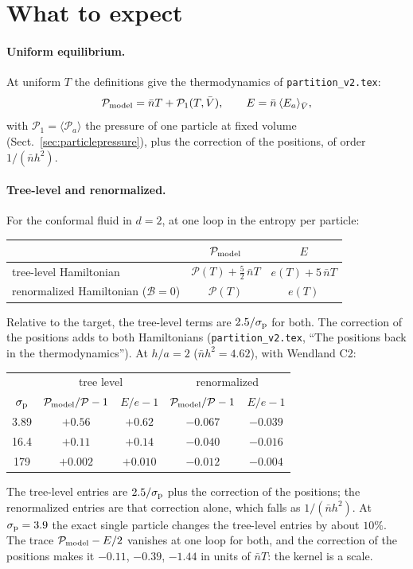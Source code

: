 \documentclass[11pt,aps,preprint,nofootinbib,superscriptaddress,tightenlines]{revtex4-2}
\newcommand{\avg}[1]{\langle #1\rangle}
\newcommand{\klab}{\mathcal B}
\def\pr{{\mathcal P}}
\def\er{e}
\def\st{\begin{equation}}
\def\stp{\end{equation}}
\def\Sect#1{Sect.~\ref{#1}}
\let\oldparagraph\paragraph
\renewcommand{\paragraph}{\par\bigskip\oldparagraph}
\begin{document}
\section{What to expect}
\label{sec:expect}

\paragraph{Uniform equilibrium.}  At uniform $T$ the definitions give the thermodynamics of \texttt{partition\_v2.tex}:
\st
\pr_{\rm model}=\bar nT+\pr_1(T,\bar V),\qquad E=\bar n\,\avg{E_a}_{\bar V} ,
\stp
with $\pr_1=\avg{\pr_a}$ the pressure of one particle at fixed volume (\Sect{sec:particlepressure}), plus the correction of the positions, of order $1/(\bar nh^2)$.

\paragraph{Tree-level and renormalized.}  For the conformal fluid in $d=2$, at one loop in the entropy per particle:
\begin{center}
\begin{tabular}{lcc}
\toprule
 & $\pr_{\rm model}$ & $E$ \\
\midrule
tree-level Hamiltonian & $\pr(T)+\tfrac52\,\bar nT$ & $\er(T)+5\,\bar nT$ \\
renormalized Hamiltonian ($\klab=0$) & $\pr(T)$ & $\er(T)$ \\
\bottomrule
\end{tabular}
\end{center}
Relative to the target, the tree-level terms are $2.5/\sigma_{\rm p}$ for both.  The correction of the positions adds to both Hamiltonians (\texttt{partition\_v2.tex},
``The positions back in the thermodynamics'').  At $h/a=2$ ($\bar nh^2=4.62$), with Wendland C2:
\begin{center}
\begin{tabular}{ccccc}
\toprule
 & \multicolumn{2}{c}{tree level} & \multicolumn{2}{c}{renormalized} \\
$\sigma_{\rm p}$ & $\pr_{\rm model}/\pr-1$ & $E/\er-1$ & $\pr_{\rm model}/\pr-1$ & $E/\er-1$ \\
\midrule
3.89 & $+0.56$ & $+0.62$ & $-0.067$ & $-0.039$ \\
16.4 & $+0.11$ & $+0.14$ & $-0.040$ & $-0.016$ \\
179  & $+0.002$ & $+0.010$ & $-0.012$ & $-0.004$ \\
\bottomrule
\end{tabular}
\end{center}
The tree-level entries are $2.5/\sigma_{\rm p}$ plus the correction of the positions; the renormalized entries are that correction alone, which falls as $1/(\bar nh^2)$.
At $\sigma_{\rm p}=3.9$ the exact single particle changes the tree-level entries by about $10\%$.  The trace $\pr_{\rm model}-E/2$ vanishes at one loop for both, and the
correction of the positions makes it $-0.11$, $-0.39$, $-1.44$ in units of $\bar nT$: the kernel is a scale.
\end{document}
